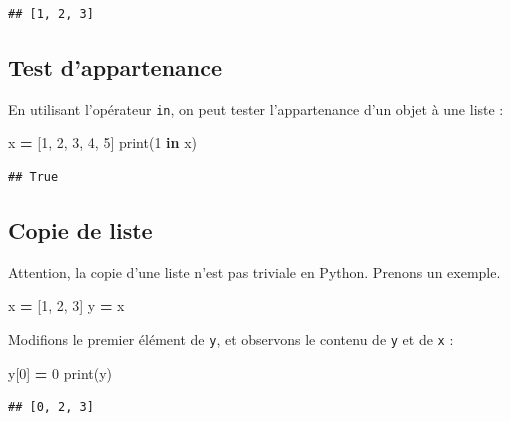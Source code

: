 \documentclass[12pt,]{book}
\newenvironment{Shaded}{\begin{snugshade}}{\end{snugshade}}
\newcommand{\KeywordTok}[1]{\textcolor[rgb]{0.13,0.29,0.53}{\textbf{#1}}}
\newcommand{\DecValTok}[1]{\textcolor[rgb]{0.00,0.00,0.81}{#1}}
\newcommand{\OperatorTok}[1]{\textcolor[rgb]{0.81,0.36,0.00}{\textbf{#1}}}
\newcommand{\BuiltInTok}[1]{#1}
\newcommand{\NormalTok}[1]{#1}
\numberwithin{equation}{section}
\numberwithin{countremarque}{section}
\begin{document}
\begin{lstlisting}
## [1, 2, 3]
\end{lstlisting}

\subsection{Test d'appartenance}\label{test-dappartenance}

En utilisant l'opérateur \texttt{in}, on peut tester l'appartenance d'un
objet à une liste :

\begin{Shaded}
\begin{Highlighting}[]
\NormalTok{x }\OperatorTok{=}\NormalTok{ [}\DecValTok{1}\NormalTok{, }\DecValTok{2}\NormalTok{, }\DecValTok{3}\NormalTok{, }\DecValTok{4}\NormalTok{, }\DecValTok{5}\NormalTok{]}
\BuiltInTok{print}\NormalTok{(}\DecValTok{1} \KeywordTok{in}\NormalTok{ x)}
\end{Highlighting}
\end{Shaded}

\begin{lstlisting}
## True
\end{lstlisting}

\subsection{Copie de liste}\label{copie-de-liste}

Attention, la copie d'une liste n'est pas triviale en Python. Prenons un
exemple.

\begin{Shaded}
\begin{Highlighting}[]
\NormalTok{x }\OperatorTok{=}\NormalTok{ [}\DecValTok{1}\NormalTok{, }\DecValTok{2}\NormalTok{, }\DecValTok{3}\NormalTok{]}
\NormalTok{y }\OperatorTok{=}\NormalTok{ x}
\end{Highlighting}
\end{Shaded}

Modifions le premier élément de \texttt{y}, et observons le contenu de
\texttt{y} et de \texttt{x} :

\begin{Shaded}
\begin{Highlighting}[]
\NormalTok{y[}\DecValTok{0}\NormalTok{] }\OperatorTok{=} \DecValTok{0}
\BuiltInTok{print}\NormalTok{(y)}
\end{Highlighting}
\end{Shaded}

\begin{lstlisting}
## [0, 2, 3]
\end{lstlisting}
\end{document}
